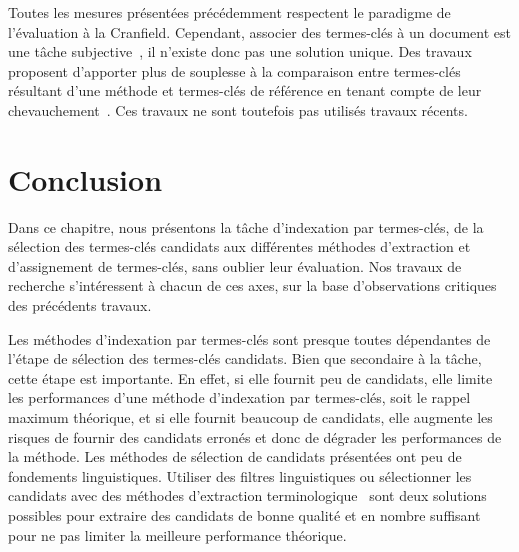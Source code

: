     Toutes les mesures présentées précédemment respectent le paradigme de
    l'évaluation \og{}à la Cranfield\fg{}. Cependant, associer des termes-clés à
    un document est une tâche subjective~\cite{hasan2014state_of_the_art}, il
    n'existe donc pas une solution unique. Des travaux proposent d'apporter plus
    de souplesse à la comparaison entre termes-clés résultant d'une méthode et
    termes-clés de référence en tenant compte de leur
    chevauchement~\cite{zesch2009rprecision,kim2010rprecision}. Ces travaux
    ne sont toutefois pas utilisés travaux récents.

  \section{Conclusion}
  \label{sec:main-state_of_the_art-automatic_evaluation_of_keyphrase_annotation-conclusion}
    Dans ce chapitre, nous présentons la tâche d'indexation par termes-clés, de
    la sélection des termes-clés candidats aux différentes méthodes d'extraction
    et d'assignement de termes-clés, sans oublier leur évaluation. Nos travaux
    de recherche s'intéressent à chacun de ces axes, sur la base d'observations
    critiques des précédents travaux.

    Les méthodes d'indexation par termes-clés sont presque toutes dépendantes
    de l'étape de sélection des termes-clés candidats. Bien que secondaire à la
    tâche, cette étape est importante. En effet, si elle fournit peu de
    candidats, elle limite les performances d'une méthode d'indexation par
    termes-clés, soit le rappel maximum théorique, et si elle fournit
    beaucoup de candidats, elle augmente les risques de fournir des candidats
    erronés et donc de dégrader les performances de la méthode. Les méthodes de
    sélection de candidats présentées ont peu de fondements linguistiques.
    Utiliser des filtres linguistiques ou sélectionner les candidats avec des
    méthodes d'extraction
    terminologique~\cite{jacquemin1997fastr,daille2003acabit,rocheteau2011termsuite}
    sont deux solutions possibles pour extraire des candidats de bonne qualité
    et en nombre suffisant pour ne pas limiter la meilleure performance
    théorique.

